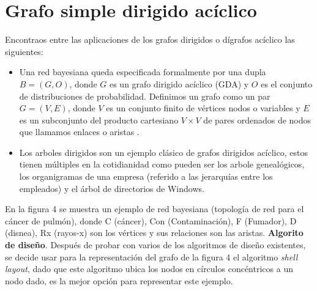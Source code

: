 \documentclass{article}
\begin{document}
\section{Grafo simple dirigido acíclico}
Encontraos entre las aplicaciones de los grafos dirigidos o dígrafos acíclico las siguientes: 
\begin{itemize}
\item Una red bayesiana queda especificada formalmente por una dupla $B= (G, O)$, donde $G$ es un grafo dirigido acíclico (GDA) y $O$ es el conjunto de distribuciones de probabilidad. Definimos un grafo como un par $G= (V, E)$, donde $ V $ es un conjunto finito de vértices nodos o variables y $E$ es un subconjunto del producto cartesiano $V \times V $ de pares ordenados de nodos que llamamos enlaces o aristas \cite{gf2}.
\item Los arboles dirigidos son un ejemplo clásico de grafos dirigidos acíclico, estos tienen múltiples en la cotidianidad como pueden ser los arbole genealógicos, los organigramas de una empresa (referido a las jerarquías entre los empleados) y el árbol de directorios de Windows.

\end{itemize}	
En la figura 4 se muestra un ejemplo de red bayesiana (topología de red para el cáncer de pulmón), donde C (cáncer), Con (Contaminación), F (Fumador), D (disnea), Rx (rayos-x) son los vértices y sus relaciones son las aristas.\linebreak 
\textbf{Algorito de diseño}.\linebreak
Después de probar con varios de los algoritmos de diseño existentes, se decide usar para la representación del grafo de la figura 4 el algoritmo \textit{shell layout}, dado que este algoritmo ubica los nodos en círculos concéntricos a un nodo dado, es la mejor opción para representar este ejemplo.



\begin{center}

\end{center}
\end{document}
